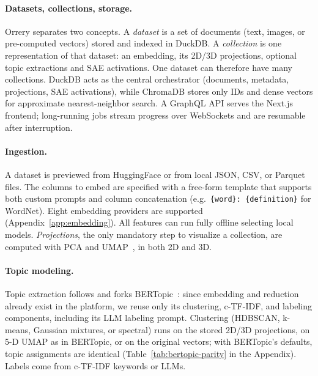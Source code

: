 \documentclass[11pt]{article}
\begin{document}
\paragraph{Datasets, collections, storage.}
Orrery separates two concepts. A \emph{dataset} is a set of documents (text, images, or pre-computed vectors) stored and indexed in DuckDB. A \emph{collection} is one representation of that dataset: an embedding, its 2D/3D projections, optional topic extractions and SAE activations. One dataset can therefore have many collections. DuckDB acts as the central orchestrator (documents, metadata, projections, SAE activations), while ChromaDB \cite{chroma2023} stores only IDs and dense vectors for approximate nearest-neighbor search. A GraphQL API serves the Next.js frontend; long-running jobs stream progress over WebSockets and are resumable after interruption.



\paragraph{Ingestion.}
A dataset is previewed from HuggingFace or from local JSON, CSV, or Parquet files. The columns to embed are specified with a free-form template that supports both custom prompts and column concatenation (e.g.\ \texttt{\{word\}: \{definition\}} for WordNet). Eight embedding providers are supported (Appendix~\ref{app:embedding}). All features can run fully offline selecting local models. \emph{Projections}, the only mandatory step to visualize a collection, are computed with PCA and UMAP~\cite{McInnes2018}, in both 2D and 3D. 

\paragraph{Topic modeling.}

Topic extraction follows and forks BERTopic~\cite{grootendorst2022bertopicneuraltopicmodeling}: since embedding and reduction already exist in the platform, we reuse only its clustering, c-TF-IDF, and labeling components, including its LLM labeling prompt. Clustering (HDBSCAN, k-means, Gaussian mixtures, or spectral) runs on the stored 2D/3D projections, on 5-D UMAP as in BERTopic, or on the original vectors; with BERTopic's defaults, topic assignments are identical (Table~\ref{tab:bertopic-parity} in the Appendix). Labels come from c-TF-IDF keywords or LLMs.
\end{document}
